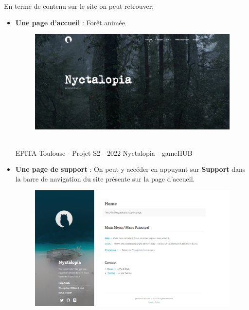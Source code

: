\noindent En terme de contenu sur le site on peut retrouver:
\newline
\begin{itemize}

    \item \textbf{Une page d'accueil} : Forêt animée
    \newline
    
\begin{figure}[H]
\centering
\begin{minipage}{.5\textwidth}
  \centering
  \centerline{\includegraphics[width=1\linewidth]{img/acceuil.PNG}}
  \label{fig:accueil}
\end{minipage}%
\end{figure}


\vfill
\noindent\makebox[\linewidth]{\rule{.8\paperwidth}{.6pt}}\\[0.2cm]
EPITA Toulouse - Projet S2 - 2022 \hfill Nyctalopia - gameHUB
\noindent\makebox[\linewidth]{\rule{.8\paperwidth}{.6pt}}
\newpage


    \item \textbf{Une page de support} : On peut y accéder en appuyant sur \textbf{Support} dans la barre de navigation du site présente sur la page d'accueil.
    \newline
    
\begin{figure}[H]
\centering
\begin{minipage}{.5\textwidth}
  \centering
  \centerline{\includegraphics[width=1\linewidth]{img/3.PNG}}
  \label{fig:accueil}
\end{minipage}%
\end{figure}    
    

\end{itemize}
